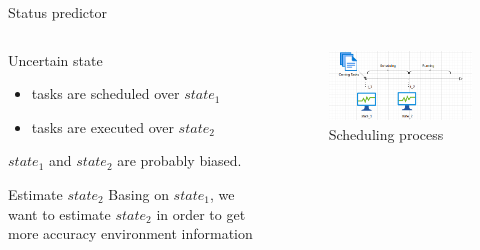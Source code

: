 \documentclass[10pt,xcolor={dvipsnames}, aspectratio=169]{beamer}
\begin{document}
\begin{frame}
{Status predictor}
	\begin{columns}[T]
	
		\begin{column}{0.48\textwidth}
			\begin{block}
			{Uncertain state}
				\begin{itemize}
					\item tasks are scheduled over $state_{1}$
					\item tasks are executed over $state_{2}$
				\end{itemize}
			$state_{1}$ and $state_{2}$ are probably biased.
			\end{block}
			
			\begin{block}
			{Estimate $state_{2}$}
			Basing on $state_{1}$, we want to estimate $state_{2}$ in order to get more accuracy environment information
			\end{block}
		\end{column}

		\hfill		
		
		\begin{column}{0.48\textwidth}
			\begin{figure}
				\centering
				\includegraphics[scale=0.4]{images/state_change.png}
				\caption{Scheduling process}
			\end{figure}		
		\end{column}
	\end{columns}
	
\end{frame}
\end{document}
